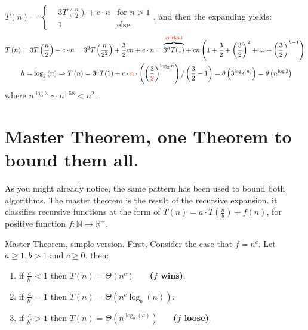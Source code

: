     \begin{example}\( T\left(n\right)  = \left\{ \begin{array}{rcl}
& 3T\left(\frac{n}{2}\right) + c\cdot n & \mbox{for }  n > 1  \\
& 1 & \mbox{else}  
\end{array}\right. \), and then the expanding yields: 
\begin{equation*}
    \begin{split}
        T\left(n\right) & = 3T\left(\frac{n}{2}\right) + c\cdot n = 3^2 T\left(\frac{n}{2^2}\right) + \frac{3}{2}cn + c\cdot n =  \overset{\text{\textcolor{red}{critical}}}{\overbrace{3^{h}T(1)}} + cn\left(1 + \frac{3}{2} + \left(\frac{3}{2}\right)^2 + ...  + \left(\frac{3}{2}\right)^{h-1} \right) \\
        & h = \log_{2}\left(n\right) \Rightarrow T\left(n\right) = 3^{h}T(1) + c\cdot \textcolor{red}{n}\cdot \left(\left(\frac{3}{\textcolor{red}{2}}\right)^{\log_{2}{n}}\right) / \left(\frac{3}{2} - 1\right) = \theta \left( 3^{\log_{2}(n)} \right) =  \theta \left( n^{\log 3} \right)  
    \end{split}
\end{equation*}
where \(n^{\log 3}  \sim n^{1.58} < n^2 \).
\end{example}


\section{Master Theorem, one Theorem to bound them all. }
As you might already notice, the same pattern has been used to bound both algorithms. The master theorem is the result of the recursive expansion. it classifies recursive functions at the form of \(T\left(n\right) = a\cdot T\left( \frac{n}{b} \right) + f\left(n\right) \), for positive function \(f : \mathbb{N} \rightarrow \mathbb{R}^{+} \).       

\begin{defbox}{Master Theorem, simple version.} First, Consider the case that \(f = n^c\). Let \( a \ge 1, b > 1\) and \( c \ge 0 \). then: 
\begin{enumerate}
    \item if \(\frac{a}{b^c} < 1 \) then \( T\left(n\right) = \Theta \left( n^c \right) \) \ \ \ \textbf{(\(f\) wins)}.
    \item if \(\frac{a}{b^c} = 1 \) then \( T\left(n\right) = \Theta \left( n^c \log_{b} \left(n\right) \right) \).
    \item if \(\frac{a}{b^c} > 1 \) then \( T\left(n\right) = \Theta \left( n^{\log_{b} \left(a\right)} \right) \) \ \ \ \textbf{(\(f\) loose)}.
  \end{enumerate}
\end{defbox}

